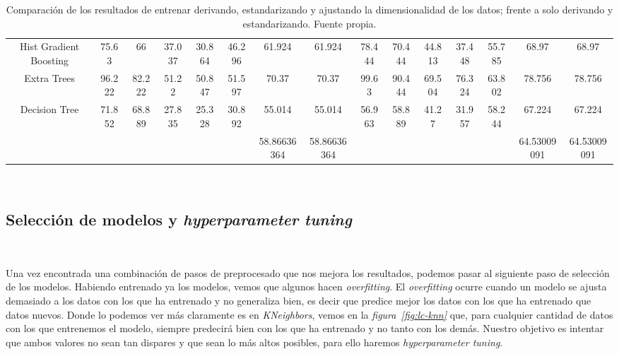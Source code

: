 \begin{table}[!h]
{\begin{tabular}{|c|ccccccc|ccccccc|}
            Hist Gradient Boosting & 75.63 & 66 & 37.037 & 30.864 & 46.296 & 61.924 & 61.924 & 78.444 & 70.444 & 44.813 & 37.448 & 55.785 & 68.97 & 68.97 \\
            Extra Trees & 96.222 & 82.222 & 51.22 & 50.847 & 51.597 & 70.37 & 70.37 & 99.63 & 90.444 & 69.504 & 76.324 & 63.802 & 78.756 & 78.756 \\
            Decision Tree & 71.852 & 68.889 & 27.835 & 25.328 & 30.892 & 55.014 & 55.014 & 56.963 & 58.889 & 41.27 & 31.957 & 58.244 & 67.224 & 67.224 \\ \hline
            & & & & & & 58.86636364 & 58.86636364 & & & & & & 64.53009091 & 64.53009091 \\ \hline
        \end{tabular}} 
    \caption{Comparación de los resultados de entrenar derivando, estandarizando y ajustando la dimensionalidad de los datos; frente a solo derivando y estandarizando. Fuente propia.}\ \label{tab:derivative-standarization-dimensionality-results}
\end{table}


\subsection{Selección de modelos y \textit{hyperparameter tuning}}\ \label{sec:entrenamiento}

Una vez encontrada una combinación de pasos de preprocesado que nos mejora los resultados, podemos pasar al siguiente paso de selección de los modelos. Habiendo entrenado ya los modelos, vemos que algunos hacen \textit{overfitting}. El \textit{overfitting} ocurre cuando un modelo se ajusta demasiado a los datos con los que ha entrenado y no generaliza bien, es decir que predice mejor los datos con los que ha entrenado que datos nuevos. Donde lo podemos ver más claramente es en \textit{KNeighbors}, vemos en la \textit{figura\ \ref{fig:lc-knn}} que, para cualquier cantidad de datos con los que entrenemos el modelo, siempre predecirá bien con los que ha entrenado y no tanto con los demás. Nuestro objetivo es intentar que ambos valores no sean tan dispares y que sean lo más altos posibles, para ello haremos \textit{hyperparameter tuning}.

